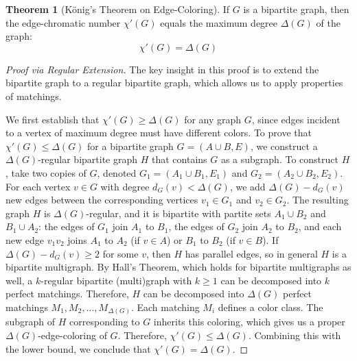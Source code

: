 \documentclass{article}
\theoremstyle{definition}
\newtheorem{theorem}{Theorem}
\begin{document}
\begin{theorem}[König's Theorem on Edge-Coloring]
If $G$ is a bipartite graph, then the edge-chromatic number $\chi'(G)$ equals the maximum degree $\Delta(G)$ of the graph:
\begin{equation}
\chi'(G) = \Delta(G)
\end{equation}
\end{theorem}

\begin{proof}[Proof via Regular Extension]
The key insight in this proof is to extend the bipartite graph to a regular bipartite graph, which allows us to apply properties of matchings.

We first establish that $\chi'(G) \geq \Delta(G)$ for any graph $G$, since edges incident to a vertex of maximum degree must have different colors. To prove that $\chi'(G) \leq \Delta(G)$ for a bipartite graph $G = (A \cup B, E)$, we construct a $\Delta(G)$-regular bipartite graph $H$ that contains $G$ as a subgraph. To construct $H$, take two copies of $G$, denoted $G_1 = (A_1 \cup B_1, E_1)$ and $G_2 = (A_2 \cup B_2, E_2)$. For each vertex $v \in G$ with degree $d_G(v) < \Delta(G)$, we add $\Delta(G) - d_G(v)$ new edges between the corresponding vertices $v_1 \in G_1$ and $v_2 \in G_2$. The resulting graph $H$ is $\Delta(G)$-regular, and it is bipartite with partite sets $A_1 \cup B_2$ and $B_1 \cup A_2$: the edges of $G_1$ join $A_1$ to $B_1$, the edges of $G_2$ join $A_2$ to $B_2$, and each new edge $v_1v_2$ joins $A_1$ to $A_2$ (if $v \in A$) or $B_1$ to $B_2$ (if $v \in B$). If $\Delta(G) - d_G(v) \geq 2$ for some $v$, then $H$ has parallel edges, so in general $H$ is a bipartite multigraph. By Hall's Theorem, which holds for bipartite multigraphs as well, a $k$-regular bipartite (multi)graph with $k \geq 1$ can be decomposed into $k$ perfect matchings. Therefore, $H$ can be decomposed into $\Delta(G)$ perfect matchings $M_1, M_2, \ldots, M_{\Delta(G)}$. Each matching $M_i$ defines a color class. The subgraph of $H$ corresponding to $G$ inherits this coloring, which gives us a proper $\Delta(G)$-edge-coloring of $G$. Therefore, $\chi'(G) \leq \Delta(G)$. Combining this with the lower bound, we conclude that $\chi'(G) = \Delta(G)$.
\end{proof}
\end{document}
